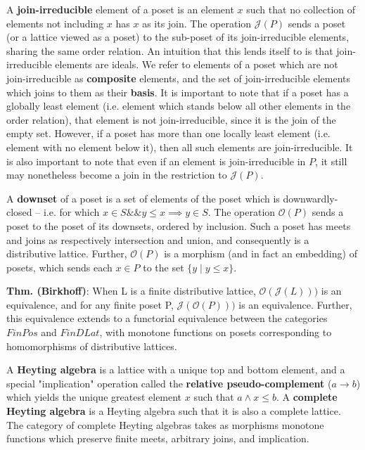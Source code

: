 \documentclass[hoptionsi,review,format=sigplan]{acmart}
\theoremstyle{definition}
\newcommand{\Oc}{\mathcal{O}}
\newcommand{\Jc}{\mathcal{J}}
\begin{document}
A \textbf{join-irreducible} element of a poset is an element \(x\) such that no collection of elements not including \(x\) has \(x\) as its join. The operation \(\Jc(P)\) sends a poset (or a lattice viewed as a poset) to the sub-poset of its join-irreducible elements, sharing the same order relation. An intuition that this lends itself to is that join-irreducible elements are ideals. We refer to elements of a poset which are not join-irreducible as \textbf{composite} elements, and the set of join-irreducible elements which joins to them as their \textbf{basis}. It is important to note that if a poset has a globally least element (i.e. element which stands below all other elements in the order relation), that element is not join-irreducible, since it is the join of the empty set. However, if a poset has more than one locally least element (i.e. element with no element below it), then all such elements are join-irreducible. It is also important to note that even if an element is join-irreducible in \(P\), it still may nonetheless become a join in the restriction to \(\Jc(P)\).

A \textbf{downset} of a poset is a set of elements of the poset which is downwardly-closed -- i.e. for which \(x \in S \mathbin{\&\&} y \le x \implies y \in S\). The operation \(\Oc(P)\) sends a poset to the poset of its downsets, ordered by inclusion. Such a poset has meets and joins as respectively intersection and union, and consequently is a distributive lattice. Further, \(\Oc(P)\) is a morphism (and in fact an embedding) of posets, which sends each \(x \in P\) to the set \(\{y \mathbin{|} y \le x\}\).

\textbf{Thm. (Birkhoff)}: When L is a finite distributive lattice, \(\Oc(\Jc(L)))\) is an equivalence, and for any finite poset P,  \(\Jc(\Oc(P)))\) is an equivalence. Further, this equivalence extends to a functorial equivalence between the categories \(FinPos\) and \(FinDLat\), with monotone functions on posets corresponding to homomorphisms of distributive lattices. 

A \textbf{Heyting algebra} is a lattice with a unique top and bottom element, and a special "implication" operation called the \textbf{relative pseudo-complement} (\(a \rightarrow b\)) which yields the unique greatest element \(x\) such that \(a \wedge x \le b\). A \textbf{complete Heyting algebra} is a Heyting algebra such that it is also a complete lattice. The category of complete Heyting algebras takes as morphisms monotone functions which preserve finite meets, arbitrary joins, and implication. 
\end{document}
